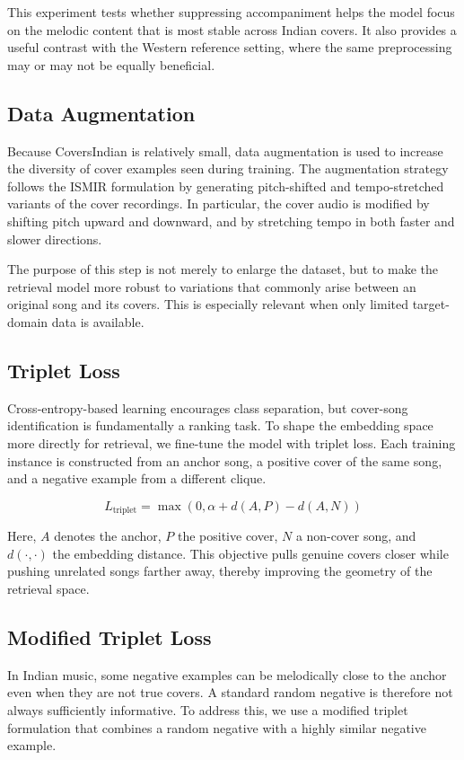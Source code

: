 \documentclass[conference]{IEEEtran}
\begin{document}
This experiment tests whether suppressing accompaniment helps the model focus on the melodic content that is most stable across Indian covers. It also provides a useful contrast with the Western reference setting, where the same preprocessing may or may not be equally beneficial.

\subsection{Data Augmentation}
Because CoversIndian is relatively small, data augmentation is used to increase the diversity of cover examples seen during training. The augmentation strategy follows the ISMIR formulation by generating pitch-shifted and tempo-stretched variants of the cover recordings. In particular, the cover audio is modified by shifting pitch upward and downward, and by stretching tempo in both faster and slower directions.

The purpose of this step is not merely to enlarge the dataset, but to make the retrieval model more robust to variations that commonly arise between an original song and its covers. This is especially relevant when only limited target-domain data is available.

\subsection{Triplet Loss}
Cross-entropy-based learning encourages class separation, but cover-song identification is fundamentally a ranking task. To shape the embedding space more directly for retrieval, we fine-tune the model with triplet loss. Each training instance is constructed from an anchor song, a positive cover of the same song, and a negative example from a different clique.

\begin{equation}
L_{\text{triplet}} = \max \left(0, \alpha + d(A,P) - d(A,N) \right)
\end{equation}

Here, $A$ denotes the anchor, $P$ the positive cover, $N$ a non-cover song, and $d(\cdot,\cdot)$ the embedding distance. This objective pulls genuine covers closer while pushing unrelated songs farther away, thereby improving the geometry of the retrieval space.

\subsection{Modified Triplet Loss}
In Indian music, some negative examples can be melodically close to the anchor even when they are not true covers. A standard random negative is therefore not always sufficiently informative. To address this, we use a modified triplet formulation that combines a random negative with a highly similar negative example.
\end{document}
